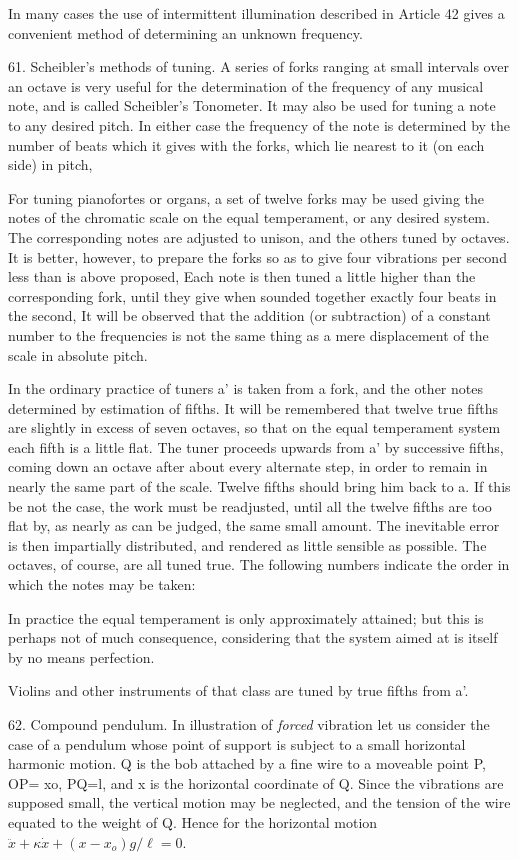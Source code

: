 In many cases the use of intermittent illumination described in Article 42
gives a convenient method of determining an unknown frequency.

61.  Scheibler’s methods of tuning.
A series of forks ranging at small intervals over an octave is very useful
for the determination of the frequency of any musical note, and is called
Scheibler's Tonometer. It may also be used for tuning a note to any desired
pitch. In either case the frequency of the note is determined by the number of
beats which it gives with the forks, which lie nearest to it (on each side) in
pitch,

For tuning pianofortes or organs, a set of twelve forks may be used giving the
notes of the chromatic scale on the equal temperament, or any desired system.
The corresponding notes are adjusted to unison, and the others tuned by
octaves. It is better, however, to prepare the forks so as to give four
vibrations per second less than is above proposed, Each note is then tuned a
little higher than the corresponding fork, until they give when sounded
together exactly four beats in the second, It will be observed that the
addition (or subtraction) of a constant number to the frequencies is not the
same thing as a mere displacement of the scale in absolute pitch.

In the ordinary practice of tuners a' is taken from a fork, and the other notes
determined by estimation of fifths. It will be remembered that twelve true
fifths are slightly in excess of seven octaves, so that on the equal
temperament system each fifth is a little flat. The tuner proceeds upwards from
a' by successive fifths, coming down an octave after about every alternate
step, in order to remain in nearly the same part of the scale. Twelve fifths
should bring him back to a. If this be not the case, the work must be
readjusted, until all the twelve fifths are too flat by, as nearly as can be
judged, the same small amount. The inevitable error is then impartially
distributed, and rendered as little sensible as possible. The octaves, of
course, are all tuned true. The following numbers indicate the order in which
the notes may be taken:

In practice the equal temperament is only approximately attained; but this is
perhaps not of much consequence, considering that the system aimed at is itself
by no means perfection.

Violins and other instruments of that class are tuned by true fifths from a'.

62.  Compound pendulum.
In illustration of \textit{forced} vibration let us consider the case of a
pendulum whose point of support is subject to a small horizontal harmonic
motion. Q is the bob attached by a fine wire to a moveable point P, OP= xo,
PQ=l, and x is the horizontal coordinate of Q. Since the vibrations are
supposed small, the vertical motion may be neglected, and the tension of the
wire equated to the weight of Q. Hence for the horizontal motion \( \ddot{x} +
\kappa \dot{x} + (x-x_o) g/\ell = 0 \).

